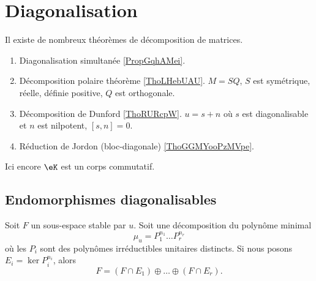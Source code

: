 \section{Diagonalisation}

Il existe de nombreux théorèmes de décomposition de matrices.
\begin{enumerate}
    \item
        Diagonalisation simultanée \ref{PropGqhAMei}.
    \item
        Décomposition polaire théorème \ref{ThoLHebUAU}. \( M=SQ\), \( S\) est symétrique, réelle, définie positive, \( Q\) est orthogonale.
    \item
        Décomposition de Dunford \ref{ThoRURcpW}. \( u=s+n\) où \( s\) est diagonalisable et \( n\) est nilpotent, \( [s,n]=0\).
    \item 
        Réduction de Jordon (bloc-diagonale) \ref{ThoGGMYooPzMVpe}.
\end{enumerate}

Ici encore \( \eK\) est un corps commutatif.

\subsection{Endomorphismes diagonalisables}

\begin{lemma}       \label{LemgnaEOk}
    Soit \( F\) un sous-espace stable par \( u\). Soit une décomposition du polynôme minimal
    \begin{equation}
        \mu_u=P_1^{n_1}\ldots P_r^{n_r}
    \end{equation}
    où les \( P_i\) sont des polynômes irréductibles unitaires distincts. Si nous posons \( E_i=\ker P_i^{n_i}\), alors
    \begin{equation}
        F=(F\cap E_1)\oplus\ldots \oplus(F\cap E_r).
    \end{equation}
\end{lemma}

